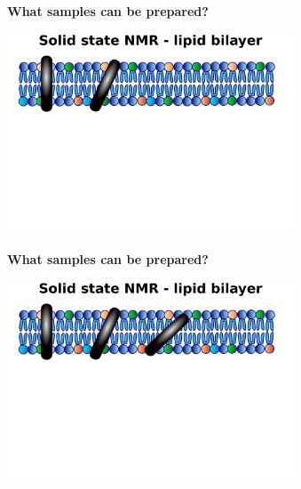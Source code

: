 \documentclass{beamer}
\begin{document}
\addtocounter{framenumber}{-1}
\begin{frame}
\begin{center}
\Large{\centering
\textbf{What samples can be prepared?} \\}

\vspace{0.5cm}

\includegraphics[height=6cm]{plots/samples7.pdf}
\end{center}
\end{frame}

\addtocounter{framenumber}{-1}
\begin{frame}
\begin{center}
\Large{\centering
\textbf{What samples can be prepared?} \\}

\vspace{0.5cm}

\includegraphics[height=6cm]{plots/samples6.pdf}
\end{center}
\end{frame}
\end{document}
